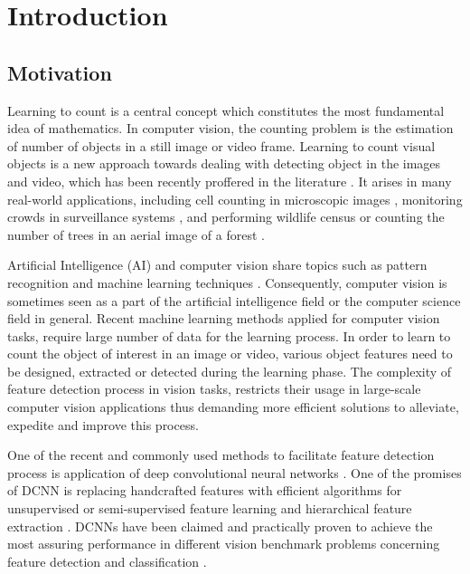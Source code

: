 \chapter{Introduction}
\label{sec:introduction}
\section{Motivation}
Learning to count is a central concept which constitutes the most fundamental idea of mathematics. In computer vision, the counting problem is the estimation of number of objects in a still image or video frame. Learning to count visual objects is a new approach towards dealing with detecting object in the images and video, which has been recently proffered in the literature \cite{rabaud2006counting, kong2005counting, chan2008privacy, segui2015learning}. It arises in many real-world applications, including cell counting in microscopic images \cite{flaccavento2011learning}, monitoring crowds in surveillance systems \cite{rahmalan2006crowd}, and performing wildlife census or counting the number of trees in an aerial image of a forest \cite{pollock1996automatic,NIPS2010_4043}. 

Artificial Intelligence (AI) and computer vision share topics such as pattern recognition and machine learning techniques \cite{mitchell1997machine}. Consequently, computer vision is sometimes seen as a part of the artificial intelligence field or the computer science field in general. Recent machine learning methods applied for computer vision tasks, require large number of data for the learning process. In order to learn to count the object of interest in an image or video, various object features need to be designed, extracted or detected during the learning phase. The complexity of feature detection process in vision tasks, restricts their usage in large-scale computer vision applications thus demanding more efficient solutions to alleviate, expedite and improve this process. 

\indent One of the recent and commonly used methods to facilitate feature detection process is application of deep convolutional neural networks \cite{szegedy2015going, krizhevsky2012imagenet, lecun1995convolutional}. One of the promises of DCNN is replacing handcrafted features with efficient algorithms for unsupervised or semi-supervised feature learning and hierarchical feature extraction \cite{song2013hierarchical}. DCNNs have been claimed and practically proven to achieve the most assuring performance in different vision benchmark problems concerning feature detection and classification \cite{szegedy2015going, ciresan2012multi}. 

